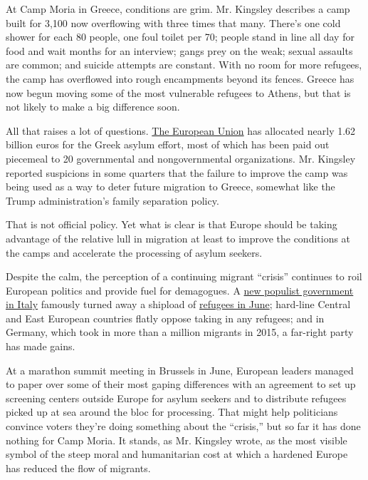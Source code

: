 At Camp Moria in Greece, conditions are grim. Mr. Kingsley describes a
camp built for 3,100 now overflowing with three times that many. There's
one cold shower for each 80 people, one foul toilet per 70; people stand
in line all day for food and wait months for an interview; gangs prey on
the weak; sexual assaults are common; and suicide attempts are constant.
With no room for more refugees, the camp has overflowed into rough
encampments beyond its fences. Greece has now begun moving some of the
most vulnerable refugees to Athens, but that is not likely to make a big
difference soon.

All that raises a lot of questions.
\href{https://ec.europa.eu/home-affairs/sites/homeaffairs/files/what-we-do/policies/european-agenda-migration/20180404-managing-migration-eu-financial-support-to-greece_en.pdf}{The
European Union} has allocated nearly 1.62 billion euros for the Greek
asylum effort, most of which has been paid out piecemeal to 20
governmental and nongovernmental organizations. Mr. Kingsley reported
suspicions in some quarters that the failure to improve the camp was
being used as a way to deter future migration to Greece, somewhat like
the Trump administration's family separation policy.

That is not official policy. Yet what is clear is that Europe should be
taking advantage of the relative lull in migration at least to improve
the conditions at the camps and accelerate the processing of asylum
seekers.

Despite the calm, the perception of a continuing migrant ``crisis''
continues to roil European politics and provide fuel for demagogues. A
\href{https://www.nytimes.com/2018/08/02/opinion/editorials/trump-conte-italy-immigration.html}{new
populist government in Italy} famously turned away a shipload of
\href{https://www.nytimes.com/2018/06/11/world/europe/italy-migrant-boat-aquarius.html}{refugees
in June}; hard-line Central and East European countries flatly oppose
taking in any refugees; and in Germany, which took in more than a
million migrants in 2015, a far-right party has made gains.

At a marathon summit meeting in Brussels in June, European leaders
managed to paper over some of their most gaping differences with an
agreement to set up screening centers outside Europe for asylum seekers
and to distribute refugees picked up at sea around the bloc for
processing. That might help politicians convince voters they're doing
something about the ``crisis,'' but so far it has done nothing for Camp
Moria. It stands, as Mr. Kingsley wrote, as the most visible symbol of
the steep moral and humanitarian cost at which a hardened Europe has
reduced the flow of migrants.

